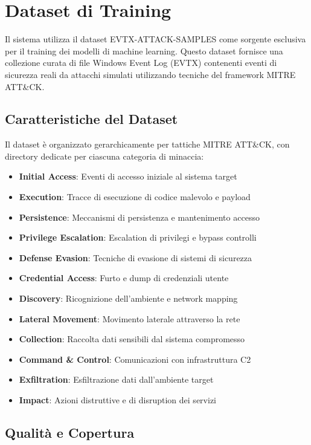 \documentclass[12pt,a4paper]{report}
\theoremstyle{definition}
\begin{document}
\section{Dataset di Training}

Il sistema utilizza il dataset EVTX-ATTACK-SAMPLES come sorgente esclusiva per il training dei modelli di machine learning. Questo dataset fornisce una collezione curata di file Windows Event Log (EVTX) contenenti eventi di sicurezza reali da attacchi simulati utilizzando tecniche del framework MITRE ATT\&CK.

\subsection{Caratteristiche del Dataset}

Il dataset è organizzato gerarchicamente per tattiche MITRE ATT\&CK, con directory dedicate per ciascuna categoria di minaccia:

\begin{itemize}
\item \textbf{Initial Access}: Eventi di accesso iniziale al sistema target
\item \textbf{Execution}: Tracce di esecuzione di codice malevolo e payload
\item \textbf{Persistence}: Meccanismi di persistenza e mantenimento accesso
\item \textbf{Privilege Escalation}: Escalation di privilegi e bypass controlli
\item \textbf{Defense Evasion}: Tecniche di evasione di sistemi di sicurezza
\item \textbf{Credential Access}: Furto e dump di credenziali utente
\item \textbf{Discovery}: Ricognizione dell'ambiente e network mapping
\item \textbf{Lateral Movement}: Movimento laterale attraverso la rete
\item \textbf{Collection}: Raccolta dati sensibili dal sistema compromesso
\item \textbf{Command \& Control}: Comunicazioni con infrastruttura C2
\item \textbf{Exfiltration}: Esfiltrazione dati dall'ambiente target
\item \textbf{Impact}: Azioni distruttive e di disruption dei servizi
\end{itemize}

\subsection{Qualità e Copertura}
\end{document}
